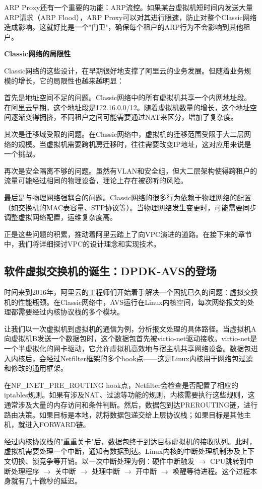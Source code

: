 ARP Proxy还有一个重要的功能：ARP流控。如果某台虚拟机短时间内发送大量ARP请求（ARP Flood），ARP Proxy可以对其进行限速，防止对整个Classic网络造成影响。这就好比是一个"门卫"，确保每个租户的ARP行为不会影响到其他租户。

\textbf{Classic网络的局限性}

Classic网络的这些设计，在早期很好地支撑了阿里云的业务发展。但随着业务规模的增长，它的局限性也越来越明显：

首先是地址空间不足的问题。Classic网络中的所有虚拟机共享一个内网地址段。在阿里云早期，这个地址段是172.16.0.0/12。随着虚拟机数量的增长，这个地址空间逐渐变得拥挤，不同租户之间可能需要通过NAT来区分，增加了复杂度。

其次是迁移域受限的问题。在Classic网络中，虚拟机的迁移范围受限于大二层网络的规模。当虚拟机需要跨机房迁移时，往往需要改变IP地址，这对应用来说是一个挑战。

再次是安全隔离不够的问题。虽然有VLAN和安全组，但大二层架构使得跨租户的流量可能经过相同的物理设备，理论上存在被窃听的风险。

最后是与物理网络强耦合的问题。Classic网络的很多行为依赖于物理网络的配置（如交换机的MAC表容量、STP协议等）。当物理网络发生变更时，可能需要同步调整虚拟网络配置，运维复杂度高。

正是这些问题的积累，推动着阿里云踏上了向VPC演进的道路。在接下来的章节中，我们将详细探讨VPC的设计理念和实现技术。

\subsection{软件虚拟交换机的诞生：DPDK-AVS的登场}

时间来到2016年，阿里云的工程师们开始着手解决一个困扰已久的问题：虚拟交换机的性能瓶颈。在Classic网络中，AVS运行在Linux内核空间，每次网络报文的处理都需要经过内核协议栈的多个模块。

让我们以一次虚拟机到虚拟机的通信为例，分析报文处理的具体路径。当虚拟机A向虚拟机B发送一个数据包时，这个数据包首先被virtio-net驱动接收。virtio-net是一个半虚拟化的网卡驱动，它允许虚拟机高效地与宿主机共享网络设备。数据包进入内核后，会经过Netfilter框架的多个hook点——这是Linux内核用于网络包过滤和修改的通用框架。

在NF_INET_PRE_ROUTING hook点，Netfilter会检查是否配置了相应的iptables规则。如果有涉及NAT、过滤等功能的规则，内核需要执行这些规则，这通常涉及大量的内存访问和条件判断。然后，数据包到达PREROUTING链，进行路由决策。如果目标是本地，就将数据包递交给上层协议栈；如果目标是其他主机，就进入FORWARD链。

经过内核协议栈的"重重关卡"后，数据包终于到达目标虚拟机的接收队列。此时，虚拟机需要处理一个中断，通知有数据到达。Linux内核的中断处理机制涉及上下文切换、锁竞争等开销。以一次中断处理为例：硬件中断触发 $\rightarrow$ CPU跳转到中断处理程序 $\rightarrow$ 关中断 $\rightarrow$ 处理中断 $\rightarrow$ 开中断 $\rightarrow$ 唤醒等待进程。这个过程本身就有几十微秒的延迟。

